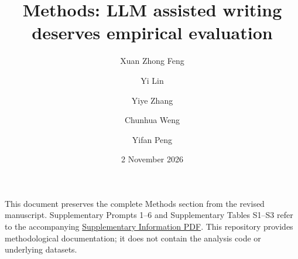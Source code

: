 \documentclass[11pt]{article}
\title{Methods: LLM assisted writing deserves empirical evaluation}
\author{Xuan Zhong Feng \and Yi Lin \and Yiye Zhang \and Chunhua Weng \and Yifan Peng}
\date{2 November 2026}
\begin{document}
\maketitle
This document preserves the complete Methods section from the revised manuscript. Supplementary Prompts 1--6 and Supplementary Tables S1--S3 refer to the accompanying \href{supplementary-information.pdf}{Supplementary Information PDF}. This repository provides methodological documentation; it does not contain the analysis code or underlying datasets.



\end{document}
